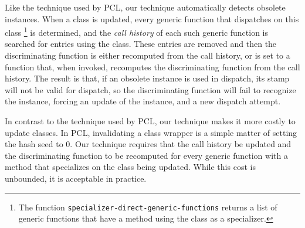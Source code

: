 Like the technique used by PCL, our technique automatically detects
obsolete instances.  When a class is updated, every generic function
that dispatches on this class%
\footnote{The function
  \texttt{specializer-direct-generic-functions} returns a list of
  generic functions that have a method using the class as a specializer.}
is determined, and the \emph{call history} of each such generic
function is searched for entries using the class.  These entries are
removed and then the discriminating function is either recomputed from
the call history, or is set to a function that, when invoked,
recomputes the discriminating function from the call history.   The
result is that, if an obsolete instance is used in dispatch, its stamp
will not be valid for dispatch, so the discriminating function will
fail to recognize the instance, forcing an update of the instance, and
a new dispatch attempt. 

In contrast to the technique used by PCL, our technique makes it more
costly to update classes.  In PCL, invalidating a class wrapper is a
simple matter of setting the hash seed to $0$.  Our technique requires
that the call history be updated and the discriminating function to be
recomputed for every generic function with a method that specializes
on the class being updated.  While this cost is unbounded, it is
acceptable in practice. 

